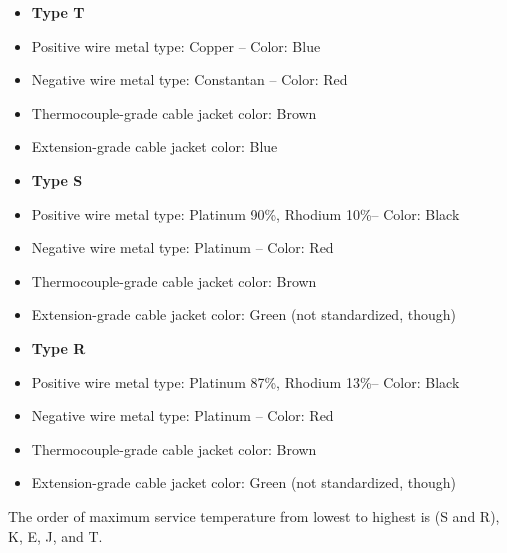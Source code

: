 \vskip 10pt

\begin{itemize}
\item{} {\bf Type T} 
\item{} Positive wire metal type: Copper -- Color: Blue 
\item{} Negative wire metal type: Constantan -- Color: Red 
\item{} Thermocouple-grade cable jacket color: Brown 
\item{} Extension-grade cable jacket color: Blue 
\end{itemize}

\vskip 10pt

\begin{itemize}
\item{} {\bf Type S} 
\item{} Positive wire metal type: Platinum 90\%, Rhodium 10\%-- Color: Black 
\item{} Negative wire metal type: Platinum -- Color: Red 
\item{} Thermocouple-grade cable jacket color: Brown 
\item{} Extension-grade cable jacket color: Green (not standardized, though)
\end{itemize}

\vskip 10pt

\begin{itemize}
\item{} {\bf Type R} 
\item{} Positive wire metal type: Platinum 87\%, Rhodium 13\%-- Color: Black 
\item{} Negative wire metal type: Platinum -- Color: Red 
\item{} Thermocouple-grade cable jacket color: Brown 
\item{} Extension-grade cable jacket color: Green (not standardized, though) 
\end{itemize}

\vskip 10pt

The order of maximum service temperature from lowest to highest is (S and R), K, E, J, and T.

